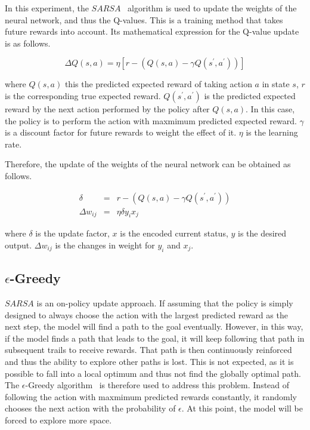 \documentclass[conference]{IEEEtran}
\begin{document}
In this experiment, the \(SARSA\)~\cite{richard2018sarsa} algorithm is used to update the weights of the neural network, and thus the Q-values. This is a training method that takes future rewards into account. Its mathematical expression for the Q-value update is as follows.

\begin{equation}
    \Delta Q(s,a)= \eta \left[r-\left(Q(s,a)-\gamma Q(s^\prime,a^\prime)\right)\right]
\end{equation}

where \(Q(s,a)\) this the predicted expected reward of taking action \(a\) in state \(s\), \(r\) is the corresponding true expected reward. \(Q(s^\prime,a^\prime)\) is the predicted expected reward by the next action performed by the policy after \(Q(s,a)\). In this case, the policy is to perform the action with maxmimum predicted expected reward.  \({\gamma}\) is a discount factor for future rewards to weight the effect of it. \({\eta}\) is the learning rate.

Therefore, the update of the weights of the neural network can be obtained as follows.

\begin{eqnarray}
    \delta &=& r-\left(Q(s,a)-\gamma Q(s^\prime,a^\prime)\right) \\
    \Delta w_{ij} &=& \eta \delta y_i x_j
\end{eqnarray}

where \({\delta}\) is the update factor, \(x\) is the encoded current status, \(y\) is the desired output. \(\Delta w_{ij}\) is the changes in weight for \(y_i\) and \(x_j\).

\subsection{\({\epsilon}\)-Greedy}

\(SARSA\) is an on-policy update approach. If assuming that the policy is simply designed to always choose the action with the largest predicted reward as the next step, the model will find a path to the goal eventually. However, in this way, if the model finds a path that leads to the goal, it will keep following that path in subsequent trails to receive rewards. That path is then continuously reinforced and thus the ability to explore other paths is lost. This is not expected, as it is possible to fall into a local optimum and thus not find the globally optimal path. The \({\epsilon}\)-Greedy algorithm~\cite{richard2018sarsa} is therefore used to address this problem. Instead of following the action with maxmimum predicted rewards constantly, it randomly chooses the next action with the probability of \({\epsilon}\). At this point, the model will be forced to explore more space.
\end{document}
